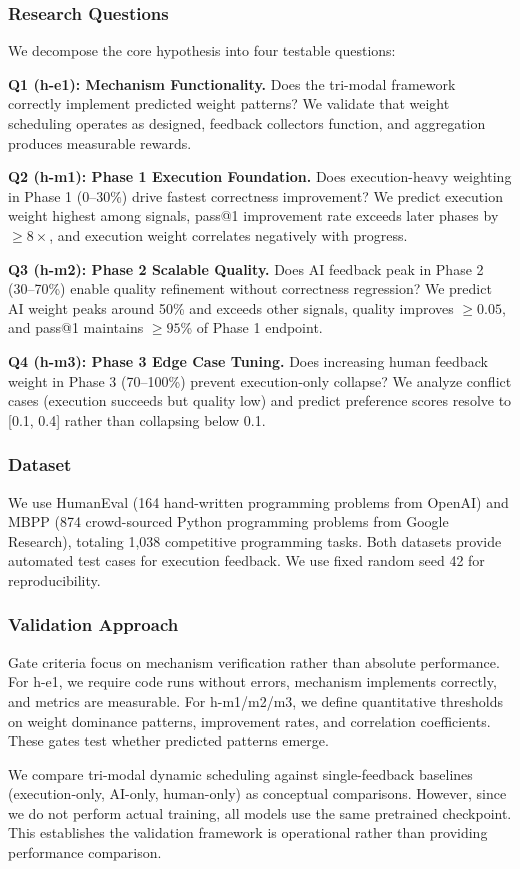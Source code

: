 
\subsubsection{Research Questions}

We decompose the core hypothesis into four testable questions:

\textbf{Q1 (h-e1): Mechanism Functionality.} Does the tri-modal framework correctly implement predicted weight patterns? We validate that weight scheduling operates as designed, feedback collectors function, and aggregation produces measurable rewards.

\textbf{Q2 (h-m1): Phase 1 Execution Foundation.} Does execution-heavy weighting in Phase 1 (0--30\%) drive fastest correctness improvement? We predict execution weight highest among signals, pass@1 improvement rate exceeds later phases by $\geq 8\times$, and execution weight correlates negatively with progress.

\textbf{Q3 (h-m2): Phase 2 Scalable Quality.} Does AI feedback peak in Phase 2 (30--70\%) enable quality refinement without correctness regression? We predict AI weight peaks around 50\% and exceeds other signals, quality improves $\geq 0.05$, and pass@1 maintains $\geq 95$\% of Phase 1 endpoint.

\textbf{Q4 (h-m3): Phase 3 Edge Case Tuning.} Does increasing human feedback weight in Phase 3 (70--100\%) prevent execution-only collapse? We analyze conflict cases (execution succeeds but quality low) and predict preference scores resolve to [0.1, 0.4] rather than collapsing below 0.1.

\subsubsection{Dataset}

We use HumanEval (164 hand-written programming problems from OpenAI) and MBPP (874 crowd-sourced Python programming problems from Google Research), totaling 1,038 competitive programming tasks. Both datasets provide automated test cases for execution feedback. We use fixed random seed 42 for reproducibility.

\subsubsection{Validation Approach}

Gate criteria focus on mechanism verification rather than absolute performance. For h-e1, we require code runs without errors, mechanism implements correctly, and metrics are measurable. For h-m1/m2/m3, we define quantitative thresholds on weight dominance patterns, improvement rates, and correlation coefficients. These gates test whether predicted patterns emerge.

We compare tri-modal dynamic scheduling against single-feedback baselines (execution-only, AI-only, human-only) as conceptual comparisons. However, since we do not perform actual training, all models use the same pretrained checkpoint. This establishes the validation framework is operational rather than providing performance comparison.
